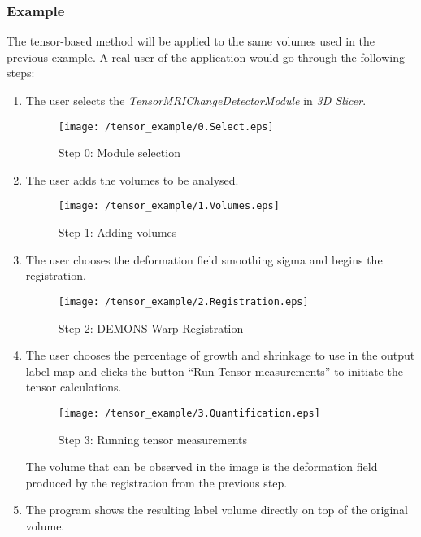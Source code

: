 \subsubsection{Example}
The tensor-based method will be applied to the same volumes used in
the previous example. A real user of the application would go through
the following steps:

\begin{enumerate}
\item The user selects the \textit{TensorMRIChangeDetectorModule} in \textit{3D Slicer}.

  \begin{figure}[H]
    \centering
    \texttt{[image: /tensor\_example/0.Select.eps]}
    \caption{Step 0: Module selection}
    \label{tensor_ex_0}
  \end{figure}
  
\item The user adds the volumes to be analysed.
  
  \begin{figure}[H]
    \centering
    \texttt{[image: /tensor\_example/1.Volumes.eps]}
    \caption{Step 1: Adding volumes}
    \label{tensor_ex_1}
  \end{figure}
  
\item The user chooses the deformation field smoothing sigma and begins the registration. 
  
  \begin{figure}[H]
    \centering
    \texttt{[image: /tensor\_example/2.Registration.eps]}
    \caption{Step 2: DEMONS Warp Registration}
    \label{tensor_ex_2}
  \end{figure}
  
  
\item  The user chooses the percentage of growth and shrinkage to
  use in the output label map and clicks the button ``Run Tensor
  measurements'' to initiate the tensor calculations.

  \begin{figure}[H]
    \centering
    \texttt{[image: /tensor\_example/3.Quantification.eps]}
    \caption{Step 3: Running tensor measurements}
    \label{tensor_ex_3}
  \end{figure}
  
  The volume that can be observed in the image is the deformation
  field produced by the registration from the previous step.

\item The program shows the resulting label volume directly on top of the original volume.
  

\end{enumerate}
